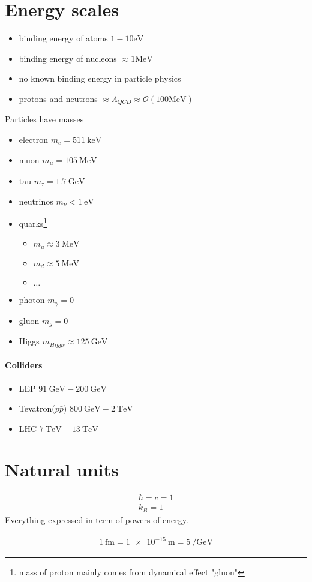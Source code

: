 \section{Energy scales}
\begin{itemize}
   \item binding energy of atoms $1-10 \si{\eV}$
   \item binding energy of nucleons $\approx 1 \si{\mega\eV}$
   \item no known binding energy in particle physics
   \item protons and neutrons $\approx \Lambda_{QCD} \approx \mathcal{O} (100 \si{\mega\eV})$
\end{itemize}

Particles have masses
\begin{itemize}
   \item electron $m_e = \SI{511}{\kilo\eV}$
   \item muon $m_\mu = \SI{105}{\mega\eV}$
   \item tau $m_\tau = \SI{1.7}{\giga\eV}$
   \item neutrinos $m_\nu < \SI{1}{\eV}$ 
   \item quarks\footnote{mass of proton mainly comes from dynamical effect "gluon"} 
      \begin{itemize}
         \item $m_u \approx \SI{3}{\mega\eV}$
         \item $m_d \approx \SI{5}{\mega\eV}$ 
         \item $\dots$
      \end{itemize}
   \item photon $m_\gamma = 0$
   \item gluon $m_g = 0$
   \item Higgs $m_{Higgs} \approx \SI{125}{\giga\eV}$
\end{itemize}

\paragraph{Colliders}
\begin{itemize}
   \item LEP $\SI{91}{\giga\eV} - \SI{200}{\giga\eV}$
   \item Tevatron($p\bar{p}$) $\SI{800}{\giga\eV} - \SI{2}{\tera\eV}$
   \item LHC $\SI{7}{\tera\eV} - \SI{13}{\tera\eV}$
\end{itemize}

\section{Natural units}
\begin{align}
   \hbar = c = 1 \\
   k_B = 1
\end{align}
Everything expressed in term of powers of energy.

\begin{align*}
   \SI{1}{\femto \m} = \SI{1e-15}{\m} = \SI{5}{\per\giga\eV}   
\end{align*}
